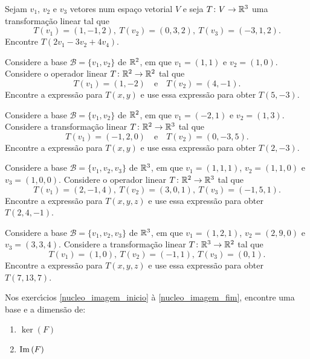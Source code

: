 \documentclass[12pt]{exam}
\begin{document}
\begin{exercicio}
  Sejam $v_1$, $v_2$ e $v_3$ vetores num espaço vetorial $V$ e seja $T \colon V \to \mathbb{R}^3$ uma transformação linear tal que
  \[
    T(v_1) = (1, -1, 2), \ T(v_2) = (0, 3, 2), \ T(v_3) = (-3, 1, 2).
  \]
  Encontre $T(2v_1 - 3v_2 + 4v_4)$.
\end{exercicio}

\begin{exercicio}
  Considere a base $\mathcal{B} = \{v_1, v_2\}$ de $\mathbb{R}^2$, em que $v_1 = (1, 1)$ e $v_2 = (1, 0)$. Considere o operador linear $T \colon \mathbb{R}^2 \to \mathbb{R}^2$ tal que
  \[
    T(v_1) = (1, -2)\quad \mbox{e} \quad T(v_2) = (4, -1).
  \]
  Encontre a expressão para $T(x, y)$ e use essa expressão para obter $T(5, -3)$.
\end{exercicio}

\begin{exercicio}
  Considere a base $\mathcal{B} = \{v_1, v_2\}$ de $\mathbb{R}^2$, em que $v_1 = (-2, 1)$ e $v_2 = (1, 3)$. Considere a transformação linear $T \colon \mathbb{R}^2 \to \mathbb{R}^3$ tal que
  \[
    T(v_1) = (-1, 2, 0)\quad \mbox{e} \quad T(v_2) = (0, -3, 5).
  \]
  Encontre a expressão para $T(x, y)$ e use essa expressão para obter $T(2, -3)$.
\end{exercicio}

\begin{exercicio}
  Considere a base $\mathcal{B} = \{v_1, v_2, v_3\}$ de $\mathbb{R}^3$, em que $v_1 = (1, 1, 1)$, $v_2 = (1, 1, 0)$ e $v_3 = (1, 0, 0)$. Considere o operador linear $T \colon \mathbb{R}^2 \to \mathbb{R}^3$ tal que
  \[
    T(v_1) = (2, -1, 4),\ T(v_2) = (3, 0, 1),\ T(v_3) = (-1, 5, 1).
  \]
  Encontre a expressão para $T(x, y, z)$ e use essa expressão para obter $T(2, 4, -1)$.
\end{exercicio}

\begin{exercicio}
  Considere a base $\mathcal{B} = \{v_1, v_2, v_3\}$ de $\mathbb{R}^3$, em que $v_1 = (1, 2, 1)$, $v_2 = (2, 9, 0)$ e $v_3 = (3, 3, 4)$. Considere a transformação linear $T \colon \mathbb{R}^3 \to \mathbb{R}^2$ tal que
  \[
    T(v_1) = (1, 0),\ T(v_2) = (-1, 1),\ T(v_3) = (0, 1).
  \]
  Encontre a expressão para $T(x, y, z)$ e use essa expressão para obter $T(7, 13, 7)$.
\end{exercicio}

Nos exerc{\'\i}cios \eqref{nucleo_imagem_inicio} \`a \eqref{nucleo_imagem_fim}, encontre uma base e a dimens\~ao de:
\begin{enumerate}[label={\alph*})]
  \item $\ker(F)$

  \item ${\rm Im\,}(F)$
\end{enumerate}
\end{document}
